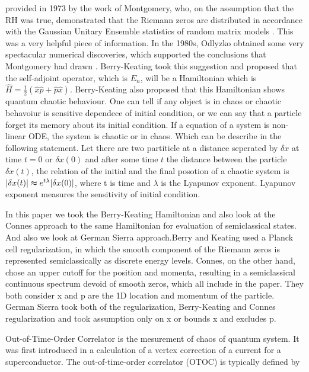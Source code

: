 \documentclass[12pt]{report}
\newcommand*{\1}{\hspace{1pt}}
\begin{document}
    provided in 1973 by the work of Montgomery, who, on the assumption that the RH was true, demonstrated that the Riemann zeros are distributed in accordance with 
    the Gaussian Unitary Ensemble statistics of random matrix models \cite{s35}. This was a very helpful piece of information. In the 1980s, Odlyzko obtained some very
    spectacular numerical discoveries, which supported the conclusions that Montgomery had drawn \cite{s36}.  Berry-Keating took this suggestion 
    and proposed that the self-adjoint operator, which 
    is $E_{n}$, will be a Hamiltonian which is $\hat{H} = \frac{1}{2}(\hat{x}\hat{p} + \hat{p}\hat{x})$. Berry-Keating also proposed that this Hamiltonian shows quantum chaotic behaviour.
    One can tell if any object is in chaos or chaotic behavoiur is sensitive dependece of initial condition, or we can say that a particle forget its memory about its initial condition.
    If a equation of a system is non-linear ODE, the system is chaotic or in chaos. Which can be describe in the following statement. Let there are two partiticle at a distance 
    seperated by $\delta x$ at time $t=0$ or  $\delta x(0)$ and after some time $t$ the distance between the particle $\delta x(t)$, the relation of the initial and the final posotion 
    of a chaotic system is $|\delta x(t)| \thickapprox e^{t\lambda} |\delta x(0)|$, where t is time and $\lambda$ is the Lyapunov exponent. Lyapunov exponent measures the sensitivity of initial 
    condition.

    In this paper we took the Berry-Keating Hamiltonian and also look at the Connes approach to the same Hamiltonian for evaluation of semiclassical states.\cite{s1,s15,s3}
    And also we look at German Sierra approach.\cite{s13}Berry and Keating used a Planck cell regularization, in which the smooth component 
    of the Riemann zeros is represented semiclassically as discrete energy levels. Connes, on the other hand, chose an upper 
    cutoff for the position and momenta, resulting in a semiclassical continuous spectrum devoid of smooth zeros, which all include in the paper.
    They both consider x and p are the 1D location and momentum of the particle. German Sierra took both of the regularization, Berry-Keating and Connes regularization 
    and took assumption only on x or bounds x and excludes p.

    Out-of-Time-Order Correlator is the mesurement of chaos  of quantum system. It was first introduced in a calculation of a vertex correction of a current for a 
    superconductor\cite{s12}.
    The out-of-time-order correlator (OTOC) is typically defined by \cite{s11}
\end{document}
